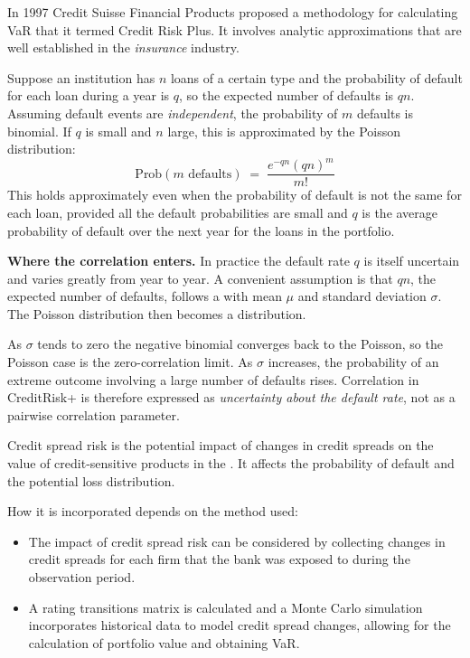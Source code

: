 \begin{crgapbox}
In 1997 Credit Suisse Financial Products proposed a methodology for calculating
VaR that it termed Credit Risk Plus. It involves analytic approximations that are
well established in the \emph{insurance} industry.

\smallskip
Suppose an institution has $n$ loans of a certain type and the probability of
default for each loan during a year is $q$, so the expected number of defaults is
$qn$. Assuming default events are \emph{independent}, the probability of $m$
defaults is binomial. If $q$ is small and $n$ large, this is approximated by the
Poisson distribution:
\[ \text{Prob}(m \text{ defaults}) \;=\; \frac{e^{-qn}(qn)^{m}}{m!} \]
This holds approximately even when the probability of default is not the same for
each loan, provided all the default probabilities are small and $q$ is the
average probability of default over the next year for the loans in the portfolio.

\smallskip
\textbf{Where the correlation enters.} In practice the default rate $q$ is itself
uncertain and varies greatly from year to year. A convenient assumption is that
$qn$, the expected number of defaults, follows a  with
mean $\mu$ and standard deviation $\sigma$. The Poisson distribution then becomes
a  distribution.

\smallskip
As $\sigma$ tends to zero the negative binomial converges back to the Poisson, so
the Poisson case is the zero-correlation limit. As $\sigma$ increases, the
probability of an extreme outcome involving a large number of defaults rises.
Correlation in CreditRisk+ is therefore expressed as \emph{uncertainty about the
default rate}, not as a pairwise correlation parameter.
\end{crgapbox}


\begin{crdefbox}
Credit spread risk is the potential impact of changes in credit spreads on the
value of credit-sensitive products in the . It affects the
probability of default and the potential loss distribution.
\end{crdefbox}

How it is incorporated depends on the method used:

\begin{itemize}
\item {} The impact of credit spread risk can be
considered by collecting changes in credit spreads for each firm that the bank
was exposed to during the observation period.
\item {} A rating transitions matrix is calculated and a Monte
Carlo simulation incorporates historical data to model credit spread changes,
allowing for the calculation of portfolio value and obtaining VaR.
\end{itemize}
